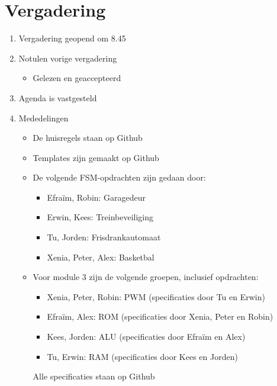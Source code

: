 \documentclass{article}
\begin{document}
\section*{Vergadering}
\begin{enumerate}
	
	\subsection*{Vooraf}
	\item Vergadering geopend om 8.45%
	\item Notulen vorige vergadering
	\begin{itemize}
		\item Gelezen en geaccepteerd
	\end{itemize}
	\item Agenda is vastgesteld
	\item Mededelingen
	\begin{itemize}
	\item De huisregels staan op Github
	\item Templates zijn gemaakt op Github
	\item De volgende FSM-opdrachten zijn gedaan door:
	\begin{itemize}
		\item Efra\"im, Robin:		Garagedeur
		\item Erwin, Kees:		Treinbeveiliging
		\item Tu, Jorden:		Frisdrankautomaat
		\item Xenia, Peter, Alex:	Basketbal
	\end{itemize}

	\item Voor module 3 zijn de volgende groepen, inclusief opdrachten:
	\begin{itemize}
		\item Xenia, Peter, Robin:			PWM (specificaties door Tu en Erwin)
		\item Efraïm, Alex:				ROM (specificaties door Xenia, Peter en Robin)
		\item Kees, Jorden:				ALU (specificaties door Efra\"im en Alex)
		\item Tu, Erwin:					RAM (specificaties door Kees en Jorden)
	\end{itemize}
	Alle specificaties staan op Github
	\end{itemize}


\end{enumerate}
\end{document}
